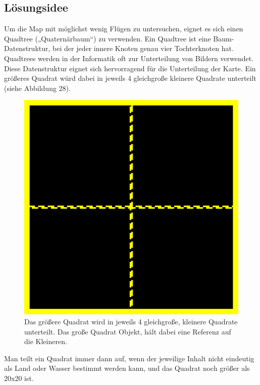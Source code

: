 \documentclass[a4paper,12pt]{article}
\begin{document}
\subsection{Lösungsidee}
Um die Map mit möglichst wenig Flügen zu untersuchen, eignet es sich einen Quadtree („Quaternärbaum“) zu verwenden. Ein Quadtree ist eine Baum-Datenstruktur, bei der jeder innere Knoten genau vier Tochterknoten hat. Quadtrees werden in der Informatik oft zur Unterteilung von Bildern verwendet.
\\[0.4cm]
Diese Datenstruktur eignet sich hervorragend für die Unterteilung der Karte. Ein größeres Quadrat würd dabei in jeweils 4 gleichgroße kleinere Quadrate unterteilt (siehe Abbildung 28).
\begin{figure}[H]
\centering
    \includegraphics[width=0.5\linewidth]{Bilder/Aufgabe3/Quadtree_Einfach.png}
    \caption{Das größere Quadrat wird in jeweils 4 gleichgroße, kleinere Quadrate unterteilt. Das große Quadrat Objekt, hält dabei eine Referenz auf die Kleineren.}
\end{figure}

Man teilt ein Quadrat immer dann auf, wenn der jeweilige Inhalt nicht eindeutig als Land oder Wasser bestimmt werden kann, und das Quadrat noch größer als 20x20 ist.
\end{document}
